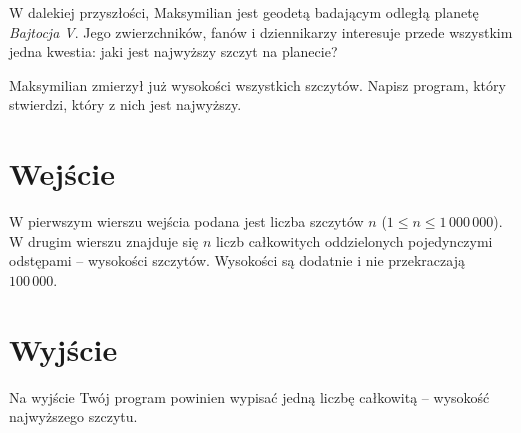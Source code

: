 \documentclass{spiral-kurs}
\begin{document}
  \makeheader
      W dalekiej przyszłości, Maksymilian jest geodetą badającym odległą planetę \emph{Bajtocja V}. Jego zwierzchników, fanów i dziennikarzy interesuje przede wszystkim jedna kwestia: jaki jest najwyższy szczyt na planecie?
      
      Maksymilian zmierzył już wysokości wszystkich szczytów. Napisz program, który stwierdzi, który z nich jest najwyższy.
      
      
  \section{Wejście}
      W pierwszym wierszu wejścia podana jest liczba szczytów $n$ ($1 \leq n \leq 1\,000\,000$). W drugim wierszu znajduje się $n$ liczb całkowitych oddzielonych pojedynczymi odstępami -- wysokości szczytów. Wysokości są dodatnie i nie przekraczają $100\,000$.
      
      
  \section{Wyjście}
      Na wyjście Twój program powinien wypisać jedną liczbę całkowitą -- wysokość najwyższego szczytu.

  
% 
% 
% 
% 
\end{document}
